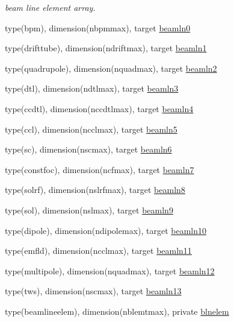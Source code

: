 \textbf{ }\par
{\em beam line element array. }\begin{DoxyCompactItemize}
\item 
type(bpm), dimension(nbpmmax), target \mbox{\hyperlink{namespaceaccsimulatorclass_a3c3a1b96070f5f9b755af7dc8502b457}{beamln0}}
\item 
type(drifttube), dimension(ndriftmax), target \mbox{\hyperlink{namespaceaccsimulatorclass_a4afbfe5b21f1ef4f6ed80b26919a5b65}{beamln1}}
\item 
type(quadrupole), dimension(nquadmax), target \mbox{\hyperlink{namespaceaccsimulatorclass_a84f0e00a948fce129634ef213a1e6146}{beamln2}}
\item 
type(dtl), dimension(ndtlmax), target \mbox{\hyperlink{namespaceaccsimulatorclass_a676f0e0a8d52bb85779983a23300d307}{beamln3}}
\item 
type(ccdtl), dimension(nccdtlmax), target \mbox{\hyperlink{namespaceaccsimulatorclass_aecdd8f634a42325f08705c6733739f5e}{beamln4}}
\item 
type(ccl), dimension(ncclmax), target \mbox{\hyperlink{namespaceaccsimulatorclass_a1fe5a7819dc79e966a915ac7109a5921}{beamln5}}
\item 
type(sc), dimension(nscmax), target \mbox{\hyperlink{namespaceaccsimulatorclass_aecb8568d8a048be9dd3f8ebf18c48e72}{beamln6}}
\item 
type(constfoc), dimension(ncfmax), target \mbox{\hyperlink{namespaceaccsimulatorclass_aee9caad06453a0e66c229bf239519041}{beamln7}}
\item 
type(solrf), dimension(nslrfmax), target \mbox{\hyperlink{namespaceaccsimulatorclass_a85003b545c7adc9e597e5fd6be9828c5}{beamln8}}
\item 
type(sol), dimension(nslmax), target \mbox{\hyperlink{namespaceaccsimulatorclass_a7685c672080dfc1af30f91257a832844}{beamln9}}
\item 
type(dipole), dimension(ndipolemax), target \mbox{\hyperlink{namespaceaccsimulatorclass_a62ff8549366c26dee5a585c8d900ebac}{beamln10}}
\item 
type(emfld), dimension(ncclmax), target \mbox{\hyperlink{namespaceaccsimulatorclass_a016c645050aaca47150651536833a42d}{beamln11}}
\item 
type(multipole), dimension(nquadmax), target \mbox{\hyperlink{namespaceaccsimulatorclass_a813aa983dff443b4b11bfcca3870d81a}{beamln12}}
\item 
type(tws), dimension(nscmax), target \mbox{\hyperlink{namespaceaccsimulatorclass_aebf4a32dfb6382e980bd128f28575547}{beamln13}}
\item 
type(beamlineelem), dimension(nblemtmax), private \mbox{\hyperlink{namespaceaccsimulatorclass_a2ca359e2c23c27bfccd5341fec0e7207}{blnelem}}
\end{DoxyCompactItemize}



